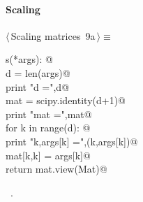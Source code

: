 \documentclass[11pt,oneside]{article}	%
\begin{document}
\paragraph{Scaling}
\begin{flushleft} \small \label{scrap20}
\protect{}$\langle\,$Scaling matrices\nobreak\ {\footnotesize 9a}$\,\rangle\equiv$
\vspace{-1ex}
\begin{list}{}{} \item
\mbox{}\verb@def s(*args): @\\
\mbox{}\verb@   d = len(args)@\\
\mbox{}\verb@   print "d =",d@\\
\mbox{}\verb@   mat = scipy.identity(d+1)@\\
\mbox{}\verb@   print "mat =",mat@\\
\mbox{}\verb@   for k in range(d): @\\
\mbox{}\verb@      print "k,args[k] =",(k,args[k])@\\
\mbox{}\verb@      mat[k,k] = args[k]@\\
\mbox{}\verb@   return mat.view(Mat)@\\
\mbox{}\verb@@{\NWsep}
\end{list}
\vspace{-1ex}
\footnotesize\addtolength{\baselineskip}{-1ex}
\begin{list}{}{\setlength{\itemsep}{-\parsep}\setlength{\itemindent}{-\leftmargin}}
\item \NWtxtMacroRefIn\ .
\end{list}
\end{flushleft}
\end{document}
